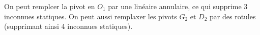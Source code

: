 On peut remplcer la pivot en $O_1$ par une linéaire annulaire, ce qui supprime 3 inconnues statiques. 
On peut aussi remplaxer les pivots $G_2$ et $D_2$ par des rotules (supprimant ainsi 4 inconnues statiques).
\else
\fi
 

\ifprof
\else
\ifcolle\else
{}

\fi
\fi